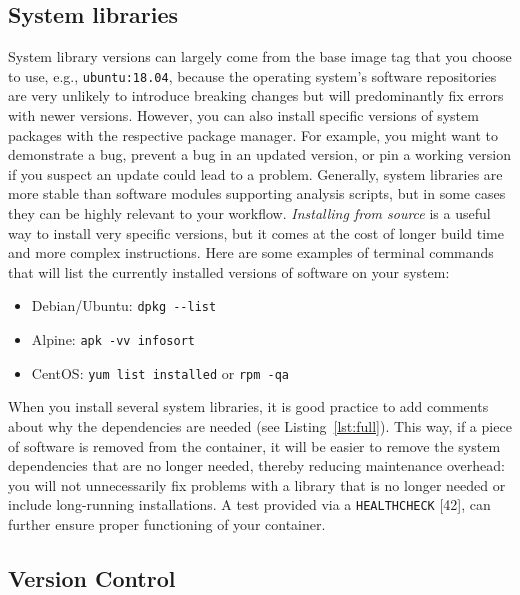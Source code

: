 \documentclass[10pt,letterpaper]{article}
\providecommand{\tightlist}{%
  \setlength{\itemsep}{0pt}\setlength{\parskip}{0pt}}
\begin{document}
\hypertarget{system-libraries}{%
\subsection{System libraries}\label{system-libraries}}

System library versions can largely come from the base image tag that
you choose to use, e.g., \texttt{ubuntu:18.04}, because the operating
system's software repositories are very unlikely to introduce breaking
changes but will predominantly fix errors with newer versions. However,
you can also install specific versions of system packages with the
respective package manager. For example, you might want to demonstrate a
bug, prevent a bug in an updated version, or pin a working version if
you suspect an update could lead to a problem. Generally, system
libraries are more stable than software modules supporting analysis
scripts, but in some cases they can be highly relevant to your workflow.
\emph{Installing from source} is a useful way to install very specific
versions, but it comes at the cost of longer build time and more complex
instructions. Here are some examples of terminal commands that will list
the currently installed versions of software on your system:

\begin{itemize}
\tightlist
\item
  Debian/Ubuntu: \texttt{dpkg\ -\/-list}
\item
  Alpine: \texttt{apk\ -vv\ info\textbar{}sort}
\item
  CentOS: \texttt{yum\ list\ installed} or \texttt{rpm\ -qa}
\end{itemize}

When you install several system libraries, it is good practice to add
comments about why the dependencies are needed (see
Listing~\ref{lst:full}). This way, if a piece of software is removed
from the container, it will be easier to remove the system dependencies
that are no longer needed, thereby reducing maintenance overhead: you
will not unnecessarily fix problems with a library that is no longer
needed or include long-running installations. A test provided via a
\texttt{HEALTHCHECK} {[}42{]}, can further ensure proper functioning of
your container.

\hypertarget{version-control}{%
\subsection{Version Control}\label{version-control}}
\end{document}
